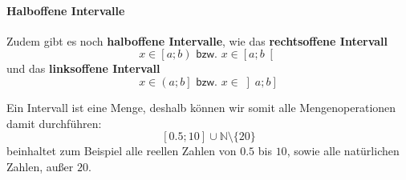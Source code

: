 \paragraph{Halboffene Intervalle}
\begin{flushleft}
Zudem gibt es noch \textbf{halboffene Intervalle}, wie das \textbf{rechtsoffene Intervall}
\begin{equation*}
x \in \left[a;b \right) \textsf{ bzw. } x \in \left[a;b \right[
\end{equation*}
und das \textbf{linksoffene Intervall}
\begin{equation*}
x \in \left(a;b \right] \textsf{ bzw. } x \in \left] a;b \right]
\end{equation*}
\end{flushleft}

\begin{warning}
Ein Intervall ist eine Menge, deshalb können wir somit alle Mengenoperationen damit durchführen:
\begin{equation*}
\left[0.5;10\right] \cup \mathbb{N} \setminus \{20\}
\end{equation*}
beinhaltet zum Beispiel alle reellen Zahlen von $0.5$ bis $10$, sowie alle natürlichen Zahlen, außer $20$.
\end{warning}

